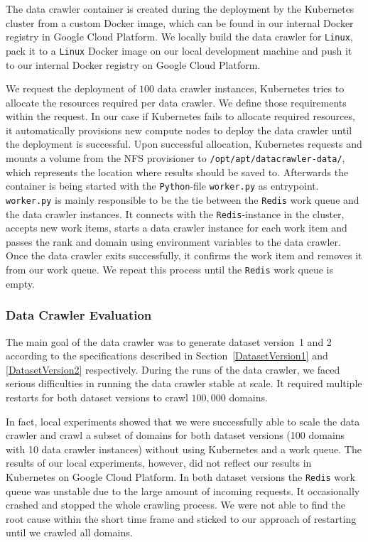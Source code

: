 The data crawler container is created during the deployment by the Kubernetes cluster from a custom Docker image, which can be found in our internal Docker registry in Google Cloud Platform. We locally build the data crawler for \texttt{Linux}, pack it to a \texttt{Linux} Docker image on our local development machine and push it to our internal Docker registry on Google Cloud Platform. 

We request the deployment of $100$ data crawler instances, Kubernetes tries to allocate the resources required per data crawler. We define those requirements within the request. In our case if Kubernetes fails to allocate required resources, it automatically provisions new compute nodes to deploy the data crawler until the deployment is successful. Upon successful allocation, Kubernetes requests and mounts a volume from the NFS provisioner to \texttt{/opt/apt/datacrawler-data/}, which represents the location where results should be saved to. Afterwards the container is being started with the \texttt{Python}-file \texttt{worker.py} as entrypoint. \texttt{worker.py} is mainly responsible to be the tie between the \texttt{Redis} work queue and the data crawler instances. It connects with the \texttt{Redis}-instance in the cluster, accepts new work items, starts a data crawler instance for each work item and passes the rank and domain using environment variables to the data crawler.
Once the data crawler exits successfully, it confirms the work item and removes it from our work queue. We repeat this process until the \texttt{Redis} work queue is empty.

\subsubsection{Data Crawler Evaluation}
\label{datacrawler_results}
The main goal of the data crawler was to generate dataset version~1 and 2 according to the specifications described in Section~\ref{DatasetVersion1} and \ref{DatasetVersion2} respectively. During the runs of the data crawler, we faced serious difficulties in running the data crawler stable at scale. It required multiple restarts for both dataset versions to crawl $100,000$ domains.

In fact, local experiments showed that we were successfully able to scale the data crawler and crawl a subset of domains for both dataset versions (100 domains with 10 data crawler instances) without using Kubernetes and a work queue. The results of our local experiments, however, did not reflect our results in Kubernetes on Google Cloud Platform. In both dataset versions the \texttt{Redis} work queue was unstable due to the large amount of incoming requests. It occasionally crashed and stopped the whole crawling process. We were not able to find the root cause within the short time frame and sticked to our approach of restarting until we crawled all domains.

